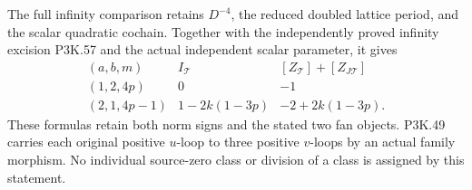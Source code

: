 \begin{theorem}
The full infinity comparison retains \(D^{-4}\), the reduced
doubled lattice period, and the scalar quadratic cochain.
Together with the independently proved infinity excision
P3K.57 and the actual independent scalar parameter, it gives
\[
 \begin{array}{c|c|c}
 (a,b,m)&I_{\mathcal T}
                &[Z_{\mathcal T}]+[Z_{J\mathcal T}]\\ \hline
 (1,2,4p)&0&-1\\
 (2,1,4p-1)&1-2k(1-3p)&-2+2k(1-3p).
 \end{array}
\]
These formulas retain both norm signs and the stated two
fan objects. P3K.49 carries each original positive \(u\)-loop
to three positive \(v\)-loops by an actual family morphism.
No individual source-zero class or division of a class is
assigned by this statement.
\end{theorem}
